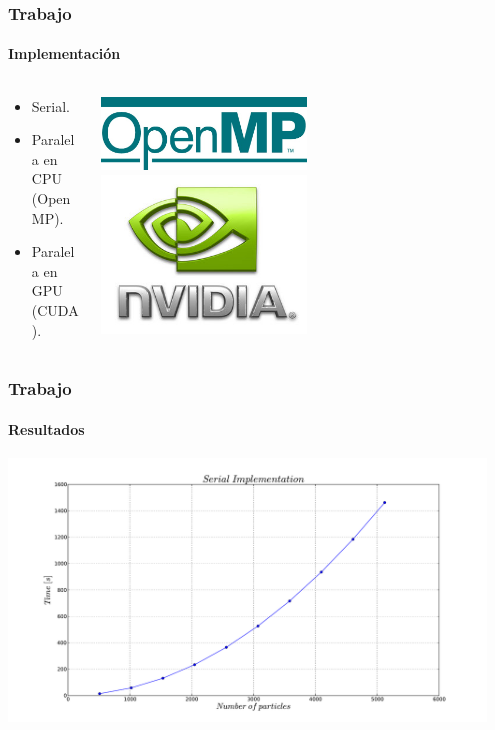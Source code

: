 \frame
{
\frametitle{Trabajo}
\framesubtitle{Implementación}
\begin{columns}
	\begin{column}{0.5\textwidth}
		\begin{itemize}
			\item Serial.
			\item Paralela en CPU (OpenMP).
			\item Paralela en GPU (CUDA).
		\end{itemize}
	\end{column}
	\begin{column}{0.5\textwidth}
		\includegraphics[width=0.5\textwidth]{img/openmp}
		\includegraphics[width=0.5\textwidth]{img/nvidia}
	\end{column}
\end{columns}
}

\frame
{
\frametitle{Trabajo}
\framesubtitle{Resultados }
\begin{center}
	\includegraphics[width=0.95\textwidth]{img/serial.pdf}
\end{center}
}

